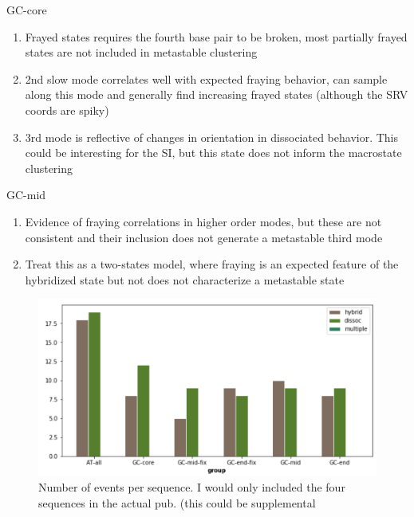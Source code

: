 \documentclass[journal=jpcbfk,manuscript=article]{achemso}
\begin{document}
GC-core
\begin{enumerate}
	\item Frayed states requires the fourth base pair to be broken, most partially frayed states are not included in metastable clustering
	\item 2nd slow mode correlates well with expected fraying behavior, can sample along this mode and generally find increasing frayed states (although the SRV coords are spiky)
	\item 3rd mode is reflective of changes in orientation in dissociated behavior. This could be interesting for the SI, but this state does not inform the macrostate clustering
\end{enumerate}  
GC-mid
\begin{enumerate}
	\item Evidence of fraying correlations in higher order modes, but these are not consistent and their inclusion does not generate a metastable third mode
	\item Treat this as a two-states model, where fraying is an expected feature of the hybridized state but not does not characterize a metastable state
\end{enumerate}  
    
\begin{figure}[ht!]
	\begin{center}
        \includegraphics[width=\textwidth]{Figs/skeleton/n_events.PNG}
        \caption{Number of events per sequence. I would only included the four sequences in the actual pub. (this could be supplemental}
        \label{fig:n_events}
	\end{center}
\end{figure}   
    
\end{document}
